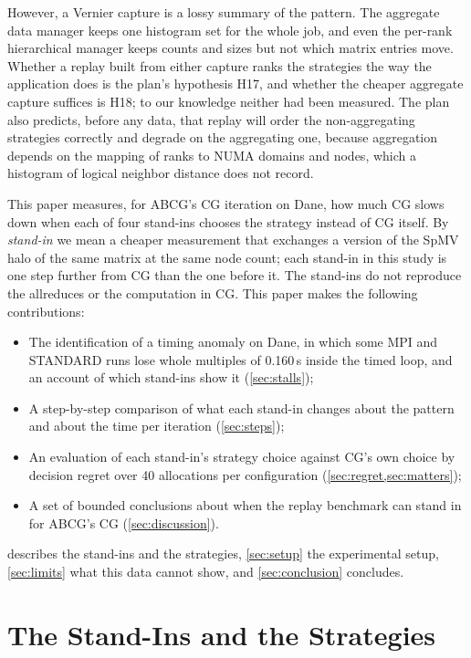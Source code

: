 \documentclass[11pt]{article}
\begin{document}
However, a Vernier capture is a lossy summary of the pattern. The aggregate data manager
keeps one histogram set for the whole job, and even the per-rank hierarchical manager
keeps counts and sizes but not which matrix entries move. Whether a replay built from
either capture ranks the strategies the way the application does is the plan's
hypothesis H17, and whether the cheaper aggregate capture suffices is H18; to our
knowledge neither had been measured. The plan also predicts, before any data, that
replay will order the non-aggregating strategies correctly and degrade on the
aggregating one, because aggregation depends on the mapping of ranks to NUMA domains and
nodes, which a histogram of logical neighbor distance does not record.

This paper measures, for ABCG's CG iteration on Dane, how much CG slows down when each
of four stand-ins chooses the strategy instead of CG itself. By \emph{stand-in} we mean
a cheaper measurement that exchanges a version of the SpMV halo of the same matrix at
the same node count; each stand-in in this study is one step further from CG than the
one before it. The stand-ins do not reproduce the allreduces or the computation in CG.
This paper makes the following contributions:
\begin{itemize}
\item The identification of a timing anomaly on Dane, in which some MPI and STANDARD
  runs lose whole multiples of 0.160\,s inside the timed loop, and an account of which
  stand-ins show it (\cref{sec:stalls});
\item A step-by-step comparison of what each stand-in changes about the pattern and
  about the time per iteration (\cref{sec:steps});
\item An evaluation of each stand-in's strategy choice against CG's own choice by
  decision regret over 40 allocations per configuration (\cref{sec:regret,sec:matters});
\item A set of bounded conclusions about when the replay benchmark can stand in for
  ABCG's CG (\cref{sec:discussion}).
\end{itemize}
 describes the stand-ins and the strategies, \cref{sec:setup} the
experimental setup, \cref{sec:limits} what this data cannot show, and
\cref{sec:conclusion} concludes.

\section{The Stand-Ins and the Strategies}
\label{sec:standins}
\end{document}
